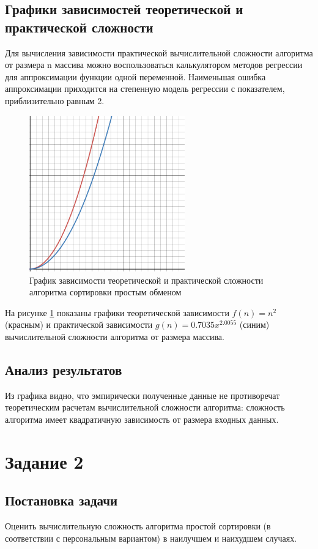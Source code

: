\documentclass[14pt]{extarticle}
\begin{document}
\subsection{Графики зависимостей теоретической и практической сложности}
Для вычисления зависимости практической вычислительной сложности
алгоритма от размера n массива можно воспользоваться калькулятором методов
регрессии для аппроксимации функции одной переменной. Наименьшая
ошибка аппроксимации приходится на степенную модель регрессии с
показателем, приблизительно равным 2.
\newpage
\begin{figure}[htpb]
  \centering
  \includegraphics[width=0.6\textwidth]{pictures/desmos_first.png}
  \caption{График зависимости теоретической и практической сложности алгоритма
  сортировки простым обменом}
  \label{fig:graph_1}
\end{figure}
На рисунке \ref{fig:graph_1} показаны графики теоретической зависимости
$f(n) = n^2$ (красным)
и практической зависимости $g(n) = 0.7035x^{2.0055}$ (синим) вычислительной сложности алгоритма
от размера массива.
\subsection{Анализ результатов}
Из графика видно, что эмпирически полученные данные не
противоречат теоретическим расчетам вычислительной сложности
алгоритма: сложность алгоритма имеет квадратичную зависимость от
размера входных данных.

\section{Задание 2}
\subsection{Постановка задачи}
Оценить вычислительную сложность алгоритма простой сортировки (в
соответствии с персональным вариантом) в наилучшем и наихудшем
случаях.
\end{document}
